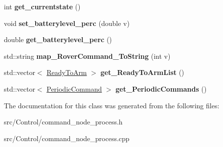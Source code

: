 \begin{DoxyCompactItemize}
int {\bfseries get\+\_\+currentstate} ()
\item 
\mbox{\label{classCommandNodeProcess_a901cb4127474e00ddf73496310e6486e}} 
void {\bfseries set\+\_\+batterylevel\+\_\+perc} (double v)
\item 
\mbox{\label{classCommandNodeProcess_a5297a8ce0b18b6da67fc416cc3250fcc}} 
double {\bfseries get\+\_\+batterylevel\+\_\+perc} ()
\item 
\mbox{\label{classCommandNodeProcess_a76ff621ea794bffd5b393a3c7ac42eff}} 
std\+::string {\bfseries map\+\_\+\+Rover\+Command\+\_\+\+To\+String} (int v)
\item 
\mbox{\label{classCommandNodeProcess_a7197293fdc27f298d1c22df8fa036b54}} 
std\+::vector$<$ \hyperlink{structReadyToArm}{Ready\+To\+Arm} $>$ {\bfseries get\+\_\+\+Ready\+To\+Arm\+List} ()
\item 
\mbox{\label{classCommandNodeProcess_a70e21c4095fb32fcfdd6c7882c667f67}} 
std\+::vector$<$ \hyperlink{structPeriodicCommand}{Periodic\+Command} $>$ {\bfseries get\+\_\+\+Periodic\+Commands} ()
\end{DoxyCompactItemize}


The documentation for this class was generated from the following files\+:\begin{DoxyCompactItemize}
\item 
src/\+Control/command\+\_\+node\+\_\+process.\+h\item 
src/\+Control/command\+\_\+node\+\_\+process.\+cpp\end{DoxyCompactItemize}
